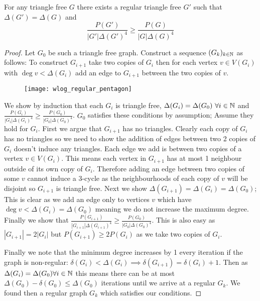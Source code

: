 \begin{lemma}
    For any triangle free $G$ there exists a regular triangle free $G'$ such that
    $\Delta(G')=\Delta(G)$ and
    \[
        \frac{P(G')}{|G'|\Delta(G')^4} \geq
        \frac{P(G)}{|G|\Delta(G)^4}
    \]
\end{lemma}

\begin{proof}
    Let $G_0$ be such a triangle free graph. Construct a sequence $(G_k)_{k\in\mathbb{N}}$ as
    follows: To construct $G_{i+1}$ take two copies of $G_i$ then for each vertex $v\in V(G_i)$
    with $\deg v < \Delta(G_i)$ add an edge to $G_{i+1}$ between the two copies of $v$.

    \begin{figure}[!ht]
        \centering
        \texttt{[image: wlog\_regular\_pentagon]}
    \end{figure}

    We show by induction that each $G_i$ is triangle free, $\Delta(G_i)=\Delta(G_0)\ \forall i\in\N$
    and $\frac{P(G_i)}{|G_i|\Delta(G_i)^4} \geq \frac{P(G_0)}{|G_0|\Delta(G_0)^4}$.
    $G_0$ satisfies these conditions
    by assumption; Assume they hold for $G_i$. First we argue that $G_{i+1}$ has no
    triangles. Clearly each copy of $G_i$ has no triangles so we need to show the
    addition of edges between two 2 copies of $G_i$ doesn't induce any triangles.
    Each edge we add is between two copies of a vertex $v\in V(G_i)$. This means
    each vertex in $G_{i+1}$ has at most 1 neighbour outside of its own copy of $G_i$.
    Therefore adding an edge between two copies of some $v$ cannot induce a 3-cycle
    as the neighbourhoods of each copy of $v$ will be disjoint so $G_{i+1}$ is
    triangle free. Next we show $\Delta(G_{i+1})=\Delta(G_i)=\Delta(G_0)$; This is
    clear as we add an edge only to vertices $v$ which have $\deg v < \Delta(G_i)=\Delta(G_0)$
    meaning we do not increase the maximum degree.
    Finally we show that
    $\frac{P(G_{i+1})}{|G_{i+1}|\Delta(G_{i+1})^4} \geq \frac{P(G_0)}{|G_0|\Delta(G_0)^4}$.
    This is also easy as $|G_{i+1}|=2|G_i|$ but $P(G_{i+1}) \geq 2 P(G_i)$ as we take
    two copies of $G_i$.

    Finally we note that the minimum degree increases by 1 every iteration if the
    graph is non-regular: $\delta(G_i) < \Delta(G_i) \implies \delta(G_{i+1})=\delta(G_i) + 1$.
    Then as $\Delta(G_i)=\Delta(G_0)\forall i\in\mathbb{N}$ this means there can be at most
    $\Delta(G_0)-\delta(G_0) \leq \Delta(G_0)$ iterations until we arrive at a regular
    $G_k$. We found then a regular graph $G_k$ which satisfies our conditions.
\end{proof}

